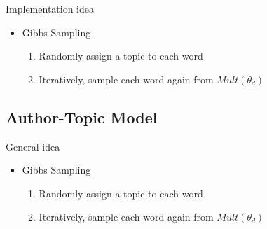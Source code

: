 \begin{frame}{\insertsubsection}{Implementation idea}
	\begin{itemize}
		\item Gibbs Sampling
		\begin{enumerate}
			\item Randomly assign a topic to each word
			\item Iteratively, sample each word again from $Mult(\theta_d)$
		\end{enumerate}
	\end{itemize}
\end{frame}

\subsection{Author-Topic Model}
\begin{frame}{\insertsubsection}{General idea}
	\begin{itemize}
		\item Gibbs Sampling
		\begin{enumerate}
			\item Randomly assign a topic to each word
			\item Iteratively, sample each word again from $Mult(\theta_d)$
		\end{enumerate}
	\end{itemize}
\end{frame}




